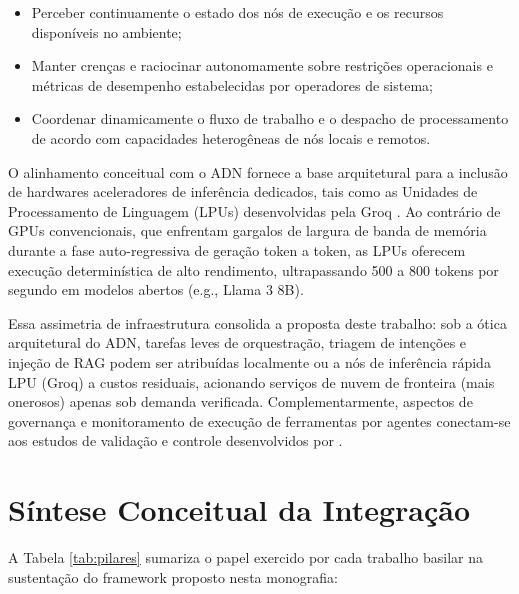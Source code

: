 \begin{itemize}
    \item Perceber continuamente o estado dos nós de execução e os recursos disponíveis no ambiente;
    \item Manter crenças e raciocinar autonomamente sobre restrições operacionais e métricas de desempenho estabelecidas por operadores de sistema;
    \item Coordenar dinamicamente o fluxo de trabalho e o despacho de processamento de acordo com capacidades heterogêneas de nós locais e remotos.
\end{itemize}

O alinhamento conceitual com o ADN fornece a base arquitetural para a inclusão de hardwares aceleradores de inferência dedicados, tais como as Unidades de Processamento de Linguagem (LPUs) desenvolvidas pela Groq \cite{groq2024lpu}. Ao contrário de GPUs convencionais, que enfrentam gargalos de largura de banda de memória durante a fase auto-regressiva de geração token a token, as LPUs oferecem execução determinística de alto rendimento, ultrapassando 500 a 800 tokens por segundo em modelos abertos (e.g., Llama 3 8B).

Essa assimetria de infraestrutura consolida a proposta deste trabalho: sob a ótica arquitetural do ADN, tarefas leves de orquestração, triagem de intenções e injeção de RAG podem ser atribuídas localmente ou a nós de inferência rápida LPU (Groq) a custos residuais, acionando serviços de nuvem de fronteira (mais onerosos) apenas sob demanda verificada. Complementarmente, aspectos de governança e monitoramento de execução de ferramentas por agentes conectam-se aos estudos de validação e controle desenvolvidos por .

\section{Síntese Conceitual da Integração}

A Tabela \ref{tab:pilares} sumariza o papel exercido por cada trabalho basilar na sustentação do framework proposto nesta monografia:


